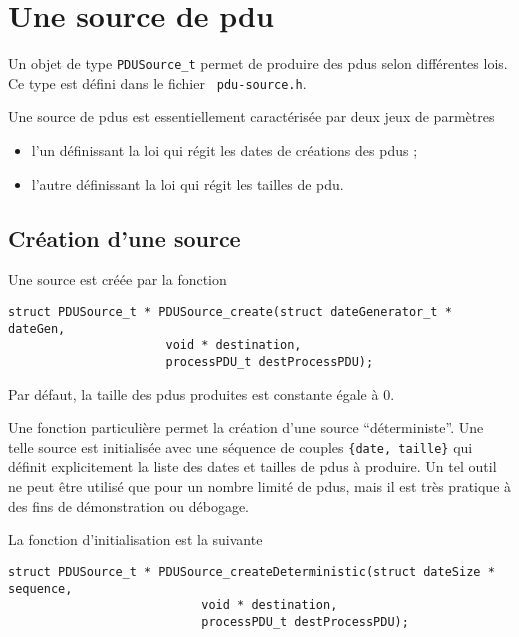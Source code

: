 %
\section{Une source de {\sc pdu}}
\label{section:pdu-source}

   Un objet de type {\tt PDUSource\_t} permet de produire des {\sc
pdu}s selon différentes lois.  Ce type est défini dans le fichier {\tt
     pdu-source.h}. 

   Une source de {\sc pdu}s est essentiellement caractérisée par deux
jeux de parmètres

\begin{itemize}
   \item l'un définissant la loi qui régit les dates de créations
     des {\sc pdu}s ;
   \item l'autre définissant la loi qui régit les tailles de {\sc
     pdu}.
\end{itemize}

%
\subsection{Création d'une source}

   Une source est créée par la fonction 

\begin{verbatim}
struct PDUSource_t * PDUSource_create(struct dateGenerator_t * dateGen,
				      void * destination,
				      processPDU_t destProcessPDU);
\end{verbatim}

   Par défaut, la taille des {\sc pdu}s produites est constante égale
à 0.

   Une fonction particulière permet la création d'une source
``déterministe''. Une telle source est initialisée avec une séquence
de couples {\tt \{date, taille\}} qui définit explicitement la liste
des dates et tailles de {\sc pdu}s à produire. Un tel outil ne peut
être utilisé que pour un nombre limité de {\sc pdu}s, mais il est très
pratique à des fins de démonstration ou débogage.

   La fonction d'initialisation est la suivante

\begin{verbatim}
struct PDUSource_t * PDUSource_createDeterministic(struct dateSize * sequence,
						   void * destination,
						   processPDU_t destProcessPDU);
\end{verbatim}

